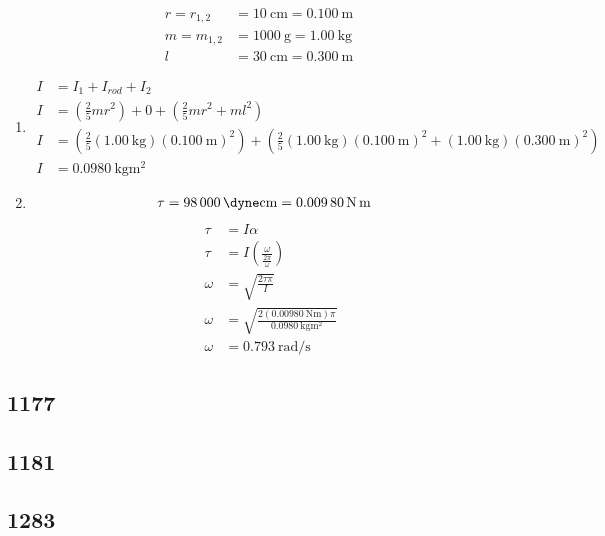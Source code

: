 \documentclass{article}
\begin{document}
\begin{align*}
	r = r_{1,2} & = \SI{10}{\centi \meter} = \SI{0.100}{\meter} \\
	m = m_{1,2} & = \SI{1000}{\gram} = \SI{1.00}{\kilogram} \\
	l & = \SI{30}{\centi \meter} = \SI{0.300}{\meter}
\end{align*}
\begin{enumerate}[label = \boldalpha]
	\item
		\begin{align*}
			I & = I_1 + I_{rod} + I_2 \\
			I & = \left( \frac{2}{5}mr^2 \right) + 0 + \left( \frac{2}{5}mr^2 + ml^2 \right) \\
			I & = \left( \frac{2}{5}(\SI{1.00}{\kilogram})(\SI{0.100}{\meter})^2 \right) + \left( \frac{2}{5}(\SI{1.00}{\kilogram})(\SI{0.100}{\meter})^2 + (\SI{1.00}{\kilogram})(\SI{0.300}{\meter})^2 \right) \\
			I & = \SI{0.0980}{\kilogram \meter \squared}
		\end{align*}
	\item
		\begin{align*}
			\tau & = \SI{98000}{\dyne \centi \meter} = \SI{0.00980}{\newton \meter}
		\end{align*}
		\begin{align*}
			\tau & = I\alpha \\
			\tau & = I \left( \frac{ \omega }{ \frac{ 2\pi }{ \omega } } \right) \\
			\omega & = \sqrt{ \frac{ 2\tau \pi }{ I } } \\
			\omega & = \sqrt{ \frac{ 2(\SI{0.00980}{\newton \meter})\pi }{ \SI{0.0980}{\kilogram \meter \squared} } } \\
			\omega & = \SI{0.793}{\radian \per \second}
		\end{align*}
\end{enumerate}

\subsection{1177}

\subsection{1181}

\subsection{1283}
\end{document}
